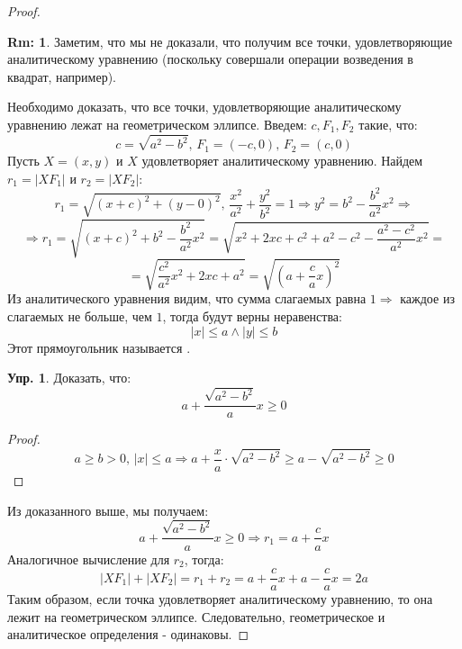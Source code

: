 \documentclass[12pt]{article}
\theoremstyle{definition}
\newtheorem{rem}{Rm:}
\newtheorem{exrc}{Упр.}
\begin{document}
\begin{proof}
	\begin{rem}
		Заметим, что мы не доказали, что получим все точки, удовлетворяющие аналитическому уравнению (поскольку совершали операции возведения в квадрат, например).
	\end{rem}
	
	Необходимо доказать, что все точки, удовлетворяющие аналитическому уравнению лежат на геометрическом эллипсе. Введем: $c, F_1, F_2$ такие, что:
	$$
		c = \sqrt{a^2 - b^2}, \, F_1 = (-c, 0), \, F_2 = (c,0)
	$$
	Пусть $X = (x,y)$ и $X$ удовлетворяет аналитическому уравнению. Найдем $r_1 = |XF_1|$ и $r_2 = |XF_2|$:
	$$
		r_1 = \sqrt{(x + c)^2 + (y - 0)^2}, \, \dfrac{x^2}{a^2} + \dfrac{y^2}{b^2} = 1 \Rightarrow y^2 = b^2 - \dfrac{b^2}{a^2}x^2 \Rightarrow 
	$$
	$$
		\Rightarrow r_1 = \sqrt{(x+c)^2 + b^2 - \dfrac{b^2}{a^2}x^2} = \sqrt{x^2 + 2xc + c^2 + a^2 - c^2 - \dfrac{a^2 - c^2}{a^2}x^2} = 
	$$
	$$
		= \sqrt{\dfrac{c^2}{a^2}x^2 + 2xc + a^2} = \sqrt{\left(a + \dfrac{c}{a}x\right)^2}
	$$
	Из аналитического уравнения видим, что сумма слагаемых равна $1 \Rightarrow$ каждое из слагаемых не больше, чем $1$, тогда будут верны неравенства: 
	$$
		|x| \leq a \wedge |y| \leq b
	$$ 
	Этот прямоугольник называется .
	
	\begin{exrc}
		Доказать, что:
		$$
			a + \dfrac{\sqrt{a^2 - b^2}}{a}x \geq 0
		$$
	\end{exrc}
	\begin{proof}
		$$
			a \geq b > 0, \, |x| \leq a \Rightarrow a + \dfrac{x}{a}{\cdot}\sqrt{a^2 - b^2} \geq a - \sqrt{a^2 - b^2} \geq 0
		$$
	\end{proof}
	Из доказанного выше, мы получаем:
	$$
		a + \dfrac{\sqrt{a^2 - b^2}}{a}x \geq 0\Rightarrow r_1= a + \dfrac{c}{a}x
	$$
	Аналогичное вычисление для $r_2$, тогда:
	$$
		|XF_1| + |XF_2| = r_1 + r_2 = a + \dfrac{c}{a}x + a - \dfrac{c}{a}x = 2a
	$$
	Таким образом, если точка удовлетворяет аналитическому уравнению, то она лежит на геометрическом эллипсе. Следовательно, геометрическое и аналитическое определения - одинаковы.
\end{proof}
\end{document}
